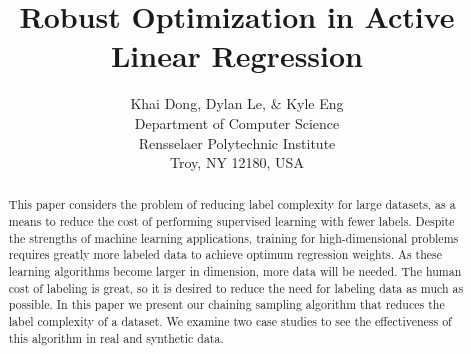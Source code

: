 \documentclass{article} %
\title{Robust Optimization in Active Linear Regression}
\author{Khai Dong, Dylan Le, \& Kyle Eng\\
Department of Computer Science\\
Rensselaer Polytechnic Institute\\
Troy, NY 12180, USA\\
}
\begin{document}
\maketitle

\begin{abstract}
This paper considers the problem of reducing label complexity for large datasets, as a means to reduce the cost of performing supervised learning with fewer labels. Despite the strengths of machine learning applications, training for high-dimensional problems requires greatly more labeled data to achieve optimum regression weights. As these learning algorithms become larger in dimension, more data will be needed. The human cost of labeling is great, so it is desired to reduce the need for labeling data as much as possible.
In this paper we present our chaining sampling algorithm that reduces the label complexity of a dataset. We examine two case studies to see the effectiveness of this algorithm in real and synthetic data.
\end{abstract}













\end{document}
